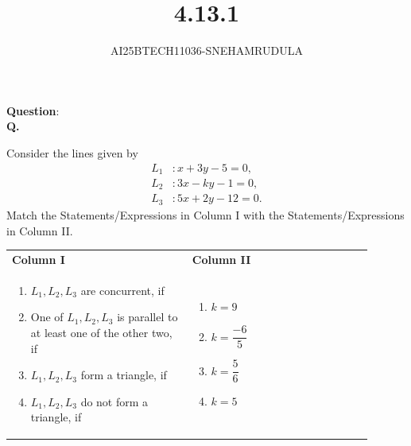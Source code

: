 \documentclass[journal]{IEEEtran}
\begin{document}

\vspace{3cm}

\title{4.13.1}
\author{AI25BTECH11036-SNEHAMRUDULA}
 \maketitle
{\let\newpage\relax\maketitle}
\renewcommand{\thefigure}{\theenumi}
\renewcommand{\thetable}{\theenumi}
\setlength{\intextsep}{10pt} 
\renewcommand{\thetable}{\theenumi}
\textbf{Question}:\\
\textbf{Q.}\;
\begin{question}
\begin{question}
Consider the lines given by
\begin{align*}
L_1 &: x + 3y - 5 = 0, \\
L_2 &: 3x - ky - 1 = 0, \\
L_3 &: 5x + 2y - 12 = 0.
\end{align*}
Match the Statements/Expressions in Column I with the Statements/Expressions in Column II.

\begin{center}
\begin{tabular}{p{0.45\linewidth} p{0.45\linewidth}}
\textbf{Column I} & \textbf{Column II} \\
\begin{enumerate}[label=(\Alph*)]
    \item $L_1, L_2, L_3$ are concurrent, if
    \item One of $L_1, L_2, L_3$ is parallel to at least one of the other two, if
    \item $L_1, L_2, L_3$ form a triangle, if
    \item $L_1, L_2, L_3$ do not form a triangle, if
\end{enumerate}
&
\begin{enumerate}[label=(\alph*)]
    \item $k = 9$
    \item $k = \dfrac{-6}{5}$
    \item $k = \dfrac{5}{6}$
    \item $k = 5$
\end{enumerate}
\end{tabular}
\end{center}
\end{question}
  

\end{question}
\end{document}
